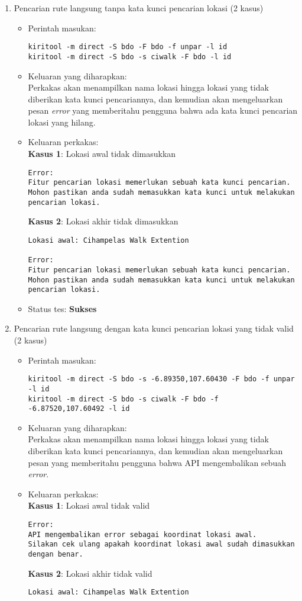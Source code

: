 \begin{enumerate}
	\item Pencarian rute langsung tanpa kata kunci pencarian lokasi (2 kasus)
	\begin{itemize}
		\item Perintah masukan:
		\begin{verbatim}
kiritool -m direct -S bdo -F bdo -f unpar -l id
kiritool -m direct -S bdo -s ciwalk -F bdo -l id
		\end{verbatim}
		\item Keluaran yang diharapkan: \\
		Perkakas akan menampilkan nama lokasi hingga lokasi yang tidak diberikan kata kunci pencariannya, dan kemudian akan mengeluarkan pesan \textit{error} yang memberitahu pengguna bahwa ada kata kunci pencarian lokasi yang hilang.
		\item Keluaran perkakas: \\
		\textbf{Kasus 1}: Lokasi awal tidak dimasukkan
		\begin{lstlisting}
Error:
Fitur pencarian lokasi memerlukan sebuah kata kunci pencarian.
Mohon pastikan anda sudah memasukkan kata kunci untuk melakukan pencarian lokasi.
		\end{lstlisting}
		\textbf{Kasus 2}: Lokasi akhir tidak dimasukkan
		\begin{lstlisting}
Lokasi awal: Cihampelas Walk Extention

Error:
Fitur pencarian lokasi memerlukan sebuah kata kunci pencarian.
Mohon pastikan anda sudah memasukkan kata kunci untuk melakukan pencarian lokasi.
		\end{lstlisting}
		\item Status tes: \textbf{Sukses}
	\end{itemize}
	
	\item Pencarian rute langsung dengan kata kunci pencarian lokasi yang tidak valid (2 kasus)
	\begin{itemize}
		\item Perintah masukan:
		\begin{verbatim}
kiritool -m direct -S bdo -s -6.89350,107.60430 -F bdo -f unpar -l id
kiritool -m direct -S bdo -s ciwalk -F bdo -f -6.87520,107.60492 -l id
		\end{verbatim}
		\item Keluaran yang diharapkan: \\
		Perkakas akan menampilkan nama lokasi hingga lokasi yang tidak diberikan kata kunci pencariannya, dan kemudian akan mengeluarkan pesan yang memberitahu pengguna bahwa API mengembalikan sebuah \textit{error}.
		\item Keluaran perkakas: \\
		\textbf{Kasus 1}: Lokasi awal tidak valid
		\begin{lstlisting}
Error:
API mengembalikan error sebagai koordinat lokasi awal.
Silakan cek ulang apakah koordinat lokasi awal sudah dimasukkan dengan benar.
		\end{lstlisting}
		\textbf{Kasus 2}: Lokasi akhir tidak valid
		\begin{lstlisting}
Lokasi awal: Cihampelas Walk Extention


\end{lstlisting}
\end{itemize}
\end{enumerate}
